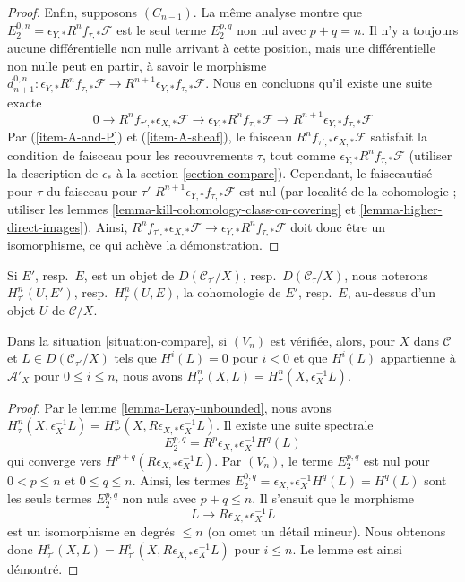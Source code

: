 \begin{proof}
\medskip\noindent
Enfin, supposons $(C_{n - 1})$. La même analyse montre que
$E_2^{0, n} = \epsilon_{Y, *}R^nf_{\tau, *}\mathcal{F}$
est le seul terme $E_2^{p, q}$ non nul avec $p + q = n$.
Il n'y a toujours aucune différentielle non nulle arrivant à cette position,
mais une différentielle non nulle peut en partir, à savoir le morphisme
$d_{n + 1}^{0, n} : \epsilon_{Y, *}R^nf_{\tau, *}\mathcal{F} \to
R^{n + 1}\epsilon_{Y, *}f_{\tau, *}\mathcal{F}$.
Nous en concluons qu'il existe une suite exacte
$$
0 \to R^nf_{\tau', *}\epsilon_{X, *}\mathcal{F} \to 
\epsilon_{Y, *}R^nf_{\tau, *}\mathcal{F} \to
R^{n + 1}\epsilon_{Y, *}f_{\tau, *}\mathcal{F}
$$
Par (\ref{item-A-and-P}) et (\ref{item-A-sheaf}), le faisceau
$R^nf_{\tau', *}\epsilon_{X, *}\mathcal{F}$
satisfait la condition de faisceau pour les recouvrements $\tau$, tout comme
$\epsilon_{Y, *}R^nf_{\tau, *}\mathcal{F}$
(utiliser la description de $\epsilon_*$ à la section \ref{section-compare}).
Cependant, le faisceautisé pour $\tau$ du faisceau pour $\tau'$
$R^{n + 1}\epsilon_{Y, *}f_{\tau, *}\mathcal{F}$
est nul (par localité de la cohomologie ; utiliser les
lemmes \ref{lemma-kill-cohomology-class-on-covering} et
\ref{lemma-higher-direct-images}).
Ainsi, $R^nf_{\tau', *}\epsilon_{X, *}\mathcal{F} \to 
\epsilon_{Y, *}R^nf_{\tau, *}\mathcal{F}$
doit donc être un isomorphisme, ce qui achève la démonstration.
\end{proof}

\noindent
Si $E'$, resp.\ $E$, est un objet de
$D(\mathcal{C}_{\tau'}/X)$, resp.\ $D(\mathcal{C}_\tau/X)$,
nous noterons
$H^n_{\tau'}(U, E')$, resp.\ $H^n_\tau(U, E)$,
la cohomologie de $E'$, resp.\ $E$,
au-dessus d'un objet $U$ de $\mathcal{C}/X$.

\begin{lemma}
\label{lemma-V-implies-cohomology-general}
Dans la situation \ref{situation-compare}, si $(V_n)$ est vérifiée, alors,
pour $X$ dans $\mathcal{C}$ et $L \in D(\mathcal{C}_{\tau'}/X)$
tels que $H^i(L) = 0$ pour $i < 0$ et que $H^i(L)$ appartienne à
$\mathcal{A}'_X$ pour $0 \leq i \leq n$, nous avons
$H^n_{\tau'}(X, L) = H^n_\tau(X, \epsilon_X^{-1}L)$.
\end{lemma}

\begin{proof}
Par le lemme \ref{lemma-Leray-unbounded}, nous avons
$H^n_\tau(X, \epsilon_X^{-1}L) =
H^n_{\tau'}(X, R\epsilon_{X, *}\epsilon_X^{-1}L)$.
Il existe une suite spectrale
$$
E_2^{p, q} = R^p\epsilon_{X, *}\epsilon_X^{-1}H^q(L)
$$
qui converge vers $H^{p + q}(R\epsilon_{X, *}\epsilon_X^{-1}L)$.
Par $(V_n)$, le terme $E_2^{p, q}$ est nul pour
$0 < p \leq n$ et $0 \leq q \leq n$. Ainsi, les termes
$E_2^{0, q} = \epsilon_{X, *}\epsilon_X^{-1}H^q(L) = H^q(L)$
sont les seuls termes $E_2^{p, q}$ non nuls avec $p + q \leq n$.
Il s'ensuit que le morphisme
$$
L \longrightarrow R\epsilon_{X, *}\epsilon_X^{-1}L
$$
est un isomorphisme en degrés $\leq n$ (on omet un détail mineur).
Nous obtenons donc
$H^i_{\tau'}(X, L) = H^i_{\tau'}(X, R\epsilon_{X, *}\epsilon_X^{-1}L)$
pour $i \leq n$. Le lemme est ainsi démontré.
\end{proof}

